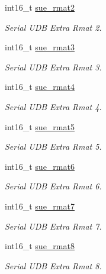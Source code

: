\begin{DoxyCompactItemize}
int16\+\_\+t \hyperlink{struct____mavlink__serial__udb__extra__f2__a__t_aff3648327987a7d3de048bb49ccbeeb8}{sue\+\_\+rmat2}
\begin{DoxyCompactList}\small\item\em Serial U\+D\+B Extra Rmat 2. \end{DoxyCompactList}\item 
int16\+\_\+t \hyperlink{struct____mavlink__serial__udb__extra__f2__a__t_a16627211aa41c5d50ca57017982f3b77}{sue\+\_\+rmat3}
\begin{DoxyCompactList}\small\item\em Serial U\+D\+B Extra Rmat 3. \end{DoxyCompactList}\item 
int16\+\_\+t \hyperlink{struct____mavlink__serial__udb__extra__f2__a__t_a44d75b17b2a4fbbdb5dbeceb449faea6}{sue\+\_\+rmat4}
\begin{DoxyCompactList}\small\item\em Serial U\+D\+B Extra Rmat 4. \end{DoxyCompactList}\item 
int16\+\_\+t \hyperlink{struct____mavlink__serial__udb__extra__f2__a__t_acadc6bde1731a79e3906d3d5eb75ee30}{sue\+\_\+rmat5}
\begin{DoxyCompactList}\small\item\em Serial U\+D\+B Extra Rmat 5. \end{DoxyCompactList}\item 
int16\+\_\+t \hyperlink{struct____mavlink__serial__udb__extra__f2__a__t_aae24e674fd4509c8cbeed6312ccfb1bf}{sue\+\_\+rmat6}
\begin{DoxyCompactList}\small\item\em Serial U\+D\+B Extra Rmat 6. \end{DoxyCompactList}\item 
int16\+\_\+t \hyperlink{struct____mavlink__serial__udb__extra__f2__a__t_acf0849d2ed188389042e9e4ada877762}{sue\+\_\+rmat7}
\begin{DoxyCompactList}\small\item\em Serial U\+D\+B Extra Rmat 7. \end{DoxyCompactList}\item 
int16\+\_\+t \hyperlink{struct____mavlink__serial__udb__extra__f2__a__t_a9ea621d5b9c1c77dc97c1fc1f6d417c2}{sue\+\_\+rmat8}
\begin{DoxyCompactList}\small\item\em Serial U\+D\+B Extra Rmat 8. \end{DoxyCompactList}\item 

\end{DoxyCompactItemize}
